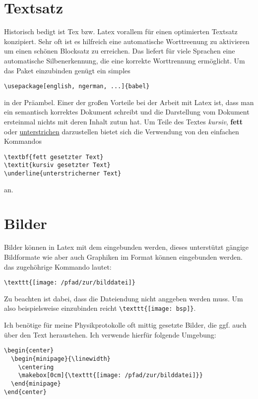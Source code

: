 \section{Textsatz}
Historisch bedigt ist Tex bzw. Latex vorallem für einen optimierten Textsatz konzipiert. Sehr oft ist es hilfreich
eine automatische Worttreenung zu aktivieren um einen schönen Blocksatz zu erreichen. Das 
liefert für viele Sprachen eine automatische Silbenerkennung, die eine korrekte Worttrennung ermöglicht. Um
das Paket einzubinden genügt ein simples
\begin{verbatim}
\usepackage[english, ngerman, ...]{babel} 
\end{verbatim}
in der Präambel. Einer der großen Vorteile bei der Arbeit mit Latex ist, dass man ein semantisch korrektes
Dokument schreibt und die Darstellung vom Dokument ersteinmal nichts mit deren Inhalt zutun hat. Um Teile
des Textes \textit{kursiv}, \textbf{fett} oder \underline{unterstrichen} darzustellen bietet sich die Verwendung 
von den einfachen Kommandos 
\begin{verbatim}
\textbf{fett gesetzter Text}
\textit{kursiv gesetzter Text}
\underline{unterstricherner Text}
\end{verbatim}
an. 

\section{Bilder}
Bilder können in Latex mit dem  eingebunden werden, dieses unterstützt gängige
Bildformate wie  aber auch Graphiken im  Format können eingebunden werden.
das zugehöhrige Kommando lautet:
\begin{verbatim}
\texttt{[image: /pfad/zur/bilddatei]}
\end{verbatim}
Zu beachten ist dabei, dass die Dateiendung nicht anggeben werden muss. Um also beispielsweise 
einzubinden reicht \verb+\texttt{[image: bsp]}+.

Ich benötige für meine Physikprotokolle oft mittig gesetzte Bilder, die ggf. auch über den Text heraustehen.
Ich verwende hierfür folgende Umgebung:
\begin{verbatim}
\begin{center}
  \begin{minipage}{\linewidth}
    \centering
    \makebox[0cm]{\texttt{[image: /pfad/zur/bilddatei]}}
  \end{minipage}
\end{center}
\end{verbatim}

